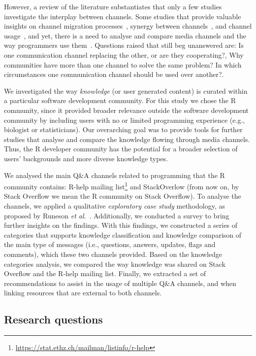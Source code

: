 \documentclass{sig-alternate-05-2015}
\begin{document}
	However, a review of the literature substantiates that only a few studies investigate the interplay between channels.
	Some studies that provide valuable insights on channel migration processes~\cite{Vasilescu2014c}, synergy between channels~\cite{Vasilescu2013a, Bird2006, Kavaler2013}, and channel usage~\cite{Stolee2010,Storey2014}, and yet, there is a need to analyse and compare media channels and the way programmers use them~\cite{Vasilescu2014b}.
	Questions raised that still beg unanswered are: Is one communication channel replacing the other, or are they cooperating?, Why communities have more than one channel to solve the same problem? In which circumstances one communication channel should be used over another?.

	We investigated the way \textit{knowledge} (or user generated content) is curated within a particular software development community.
	For this study we chose the R community, since it provided broader relevance outside the software development community by including users with no or limited programming experience (e.g., biologist or statisticians).
	Our overarching goal was to provide tools for further studies that analyse and compare the knowledge flowing through media channels.
	Thus, the R developer community has the potential for a broader selection of users' backgrounds and more diverse knowledge types. 

    We analysed the main Q\&A channels related to programming that the R community contains: R-help mailing list\footnote{\url{https://stat.ethz.ch/mailman/listinfo/r-help}} and StackOverlow (from now on, by Stack Overflow we mean the R community on Stack Overflow).
    To analyse the channels, we applied a qualitative \textit{exploratory case study} methodology, as proposed by Runeson \textit{et al}.~\cite{Runeson2012}.
	Additionally, we conducted a survey to bring further insights on the findings.
	With this findings, we constructed a series of categories that supports knowledge classification and knowledge comparison of the main type of messages (i.e., questions, answers, updates, flags and comments), which these two channels provided.
	Based on the knowledge categories analysis, we compared the way knowledge was shared on Stack Overflow and the R-help mailing list.
	Finally, we extracted a set of recommendations to assist in the usage of multiple Q\&A channels, and when linking resources that are external to both channels.

\subsection{Research questions}
\end{document}
